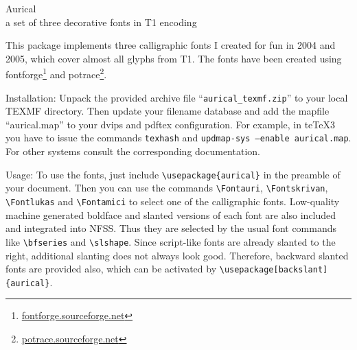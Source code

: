 \documentclass[12pt]{article}
\begin{document}
\setlength{\parindent}{0pt}
\setlength{\parskip}{\baselineskip}
\begin{center}
\Fontlukas\fontsize{40pt}{40pt}\selectfont
Aurical \\
\fontsize{30pt}{30pt}\selectfont %
\textemdash{} a set of three decorative fonts in T1 encoding \textemdash
\end{center}


This package implements three calligraphic fonts I created for fun in 2004 and
2005, which cover almost all glyphs from T1. The fonts have been created using
fontforge\footnote{\url{fontforge.sourceforge.net}} and
potrace\footnote{\url{potrace.sourceforge.net}}.

Installation: Unpack the provided archive file ``\verb!aurical_texmf.zip!'' to
your local TEXMF directory. Then update your filename database and add the
mapfile ``aurical.map'' to your dvips and pdftex configuration. For example, in
te\TeX 3 you have to issue the commands \texttt{texhash} and \texttt{updmap-sys
--enable aurical.map}. For other systems consult the corresponding
documentation.


Usage: To use the fonts, just include \verb!\usepackage{aurical}! in the
preamble of your document. Then you can use the commands \verb!\Fontauri!,
\verb!\Fontskrivan!, \verb!\Fontlukas! and \verb!\Fontamici! to select one of
the calligraphic fonts. Low-quality machine generated boldface and slanted 
versions of each font are also included and integrated into NFSS. Thus they 
are selected by the usual font commands like \verb!\bfseries! and \verb!\slshape!.
Since script-like fonts are already slanted to the right, additional slanting
does not always look good. Therefore, backward slanted fonts are provided also,  
which can be activated by \verb!\usepackage[backslant]{aurical}!.
\newpage

\centering
{}
\end{document}
